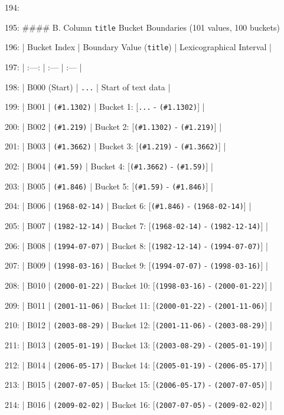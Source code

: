 \documentclass[11pt,a4paper]{article}
\begin{document}
{194:

195: \#\#\#\# B. Column \texttt{title} Bucket Boundaries (101 values, 100 buckets)

196: | Bucket Index | Boundary Value (\texttt{title}) | Lexicographical Interval |

197: | :---: | :--- | :--- |

198: | B000 (Start) | \texttt{...} | Start of text data |

199: | B001 | \texttt{(\#1.1302)} | Bucket 1: [\texttt{...} - \texttt{(\#1.1302)}] |

200: | B002 | \texttt{(\#1.219)} | Bucket 2: [\texttt{(\#1.1302)} - \texttt{(\#1.219)}] |

201: | B003 | \texttt{(\#1.3662)} | Bucket 3: [\texttt{(\#1.219)} - \texttt{(\#1.3662)}] |

202: | B004 | \texttt{(\#1.59)} | Bucket 4: [\texttt{(\#1.3662)} - \texttt{(\#1.59)}] |

203: | B005 | \texttt{(\#1.846)} | Bucket 5: [\texttt{(\#1.59)} - \texttt{(\#1.846)}] |

204: | B006 | \texttt{(1968-02-14)} | Bucket 6: [\texttt{(\#1.846)} - \texttt{(1968-02-14)}] |

205: | B007 | \texttt{(1982-12-14)} | Bucket 7: [\texttt{(1968-02-14)} - \texttt{(1982-12-14)}] |

206: | B008 | \texttt{(1994-07-07)} | Bucket 8: [\texttt{(1982-12-14)} - \texttt{(1994-07-07)}] |

207: | B009 | \texttt{(1998-03-16)} | Bucket 9: [\texttt{(1994-07-07)} - \texttt{(1998-03-16)}] |

208: | B010 | \texttt{(2000-01-22)} | Bucket 10: [\texttt{(1998-03-16)} - \texttt{(2000-01-22)}] |

209: | B011 | \texttt{(2001-11-06)} | Bucket 11: [\texttt{(2000-01-22)} - \texttt{(2001-11-06)}] |

210: | B012 | \texttt{(2003-08-29)} | Bucket 12: [\texttt{(2001-11-06)} - \texttt{(2003-08-29)}] |

211: | B013 | \texttt{(2005-01-19)} | Bucket 13: [\texttt{(2003-08-29)} - \texttt{(2005-01-19)}] |

212: | B014 | \texttt{(2006-05-17)} | Bucket 14: [\texttt{(2005-01-19)} - \texttt{(2006-05-17)}] |

213: | B015 | \texttt{(2007-07-05)} | Bucket 15: [\texttt{(2006-05-17)} - \texttt{(2007-07-05)}] |

214: | B016 | \texttt{(2009-02-02)} | Bucket 16: [\texttt{(2007-07-05)} - \texttt{(2009-02-02)}] |

}
\end{document}
